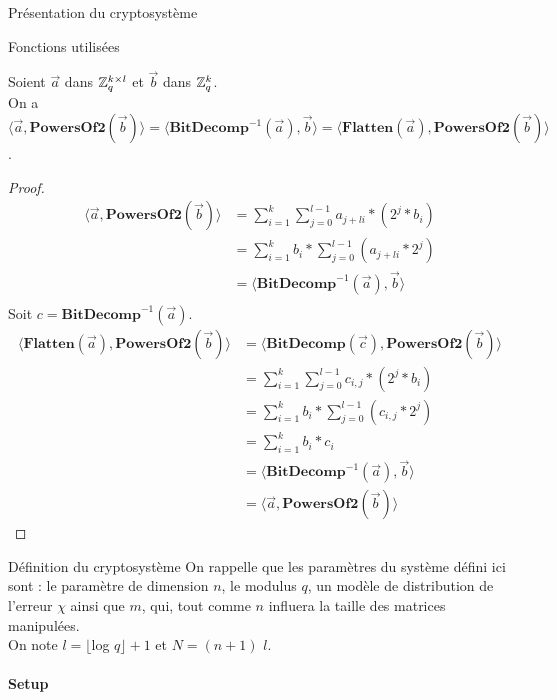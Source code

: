 \begin{section}{Présentation du cryptosystème}
\begin{subsection}{Fonctions utilisées}
	\begin{prop}
	Soient $\vec{a}$ dans $\mathbb{Z}_q^{k \times l}$ et $\vec{b}$ dans $\mathbb{Z}_q^{k}$. \\
	On a $\langle \vec{a}, \textbf{PowersOf2}(\vec{b}) \rangle = \langle \textbf{BitDecomp}^{-1}(\vec{a}), \vec{b}\rangle = \langle \textbf{Flatten}(\vec{a}),\textbf{PowersOf2}(\vec{b}) \rangle$. \\
	\end{prop}
	\begin{proof}
	\begin{align*}
	\langle \vec{a}, \textbf{PowersOf2}(\vec{b}) \rangle &= \sum\limits_{i=1}^{k} \sum\limits_{j=0}^{l-1} a_{j+li} * (2^{j} * b_i) \\
	&= \sum\limits_{i=1}^{k} b_i * \sum\limits_{j=0}^{l-1} (a_{j+li} * 2^{j}) \\
	&= \langle \textbf{BitDecomp}^{-1}(\vec{a}), \vec{b}\rangle \\
	\end{align*}
	Soit $c = \textbf{BitDecomp}^{-1}(\vec{a})$.
	\begin{align*}
	\langle \textbf{Flatten}(\vec{a}),\textbf{PowersOf2}(\vec{b}) \rangle &= \langle \textbf{BitDecomp}(\vec{c}),\textbf{PowersOf2}(\vec{b}) \rangle \\
	&= \sum\limits_{i=1}^{k} \sum\limits_{j=0}^{l-1} c_{i,j} * (2^{j} * b_i) \\
	&= \sum\limits_{i=1}^{k} b_i * \sum\limits_{j=0}^{l-1} (c_{i,j} * 2^{j}) \\
	&= \sum\limits_{i=1}^{k} b_i * c_i \\
	&= \langle \textbf{BitDecomp}^{-1}(\vec{a}), \vec{b}\rangle \\
	&= \langle \vec{a}, \textbf{PowersOf2}(\vec{b}) \rangle
	\end{align*}
	\end{proof}
	
	\end{subsection}
	\begin{subsection}{Définition du cryptosystème}
	On rappelle que les paramètres du système défini ici sont : le paramètre de dimension $n$, le modulus $q$, un modèle de distribution de l'erreur $\chi$ ainsi que $m$, qui, tout comme $n$ influera la taille des matrices manipulées. \\
	On note $l = \lfloor$log $q\rfloor + 1$ et $N = (n + 1)$ $l$.
		
	\paragraph{}
	\textbf{Setup}
	\flushleft


\end{subsection}
\end{section}
